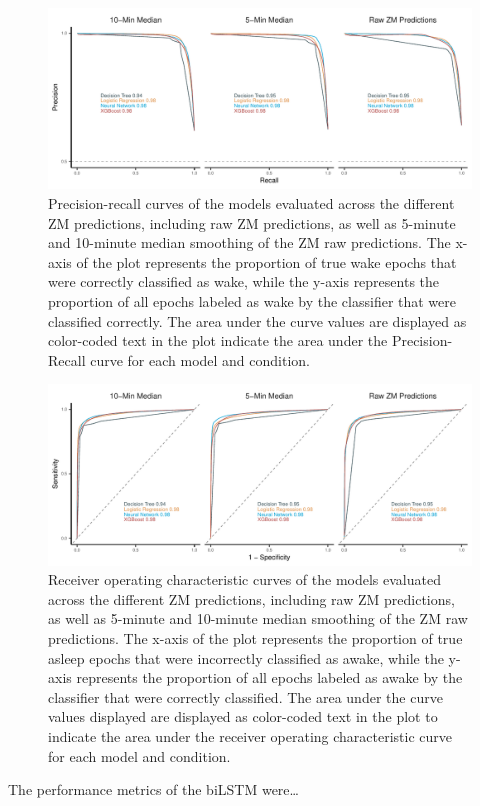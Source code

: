 \documentclass[
  super,
  preprint,
  3p]{elsarticle}
\begin{document}
\begin{figure}[b]

{\centering \includegraphics{visuals/plot_sleep_pr.pdf}

}

\caption{\label{fig-pr_curves}Precision-recall curves of the models
evaluated across the different ZM predictions, including raw ZM
predictions, as well as 5-minute and 10-minute median smoothing of the
ZM raw predictions. The x-axis of the plot represents the proportion of
true wake epochs that were correctly classified as wake, while the
y-axis represents the proportion of all epochs labeled as wake by the
classifier that were classified correctly. The area under the curve
values are displayed as color-coded text in the plot indicate the area
under the Precision-Recall curve for each model and condition.}

\end{figure}

\begin{figure}[b]

{\centering \includegraphics{visuals/plot_sleep_roc.pdf}

}

\caption{\label{fig-roc_curves}Receiver operating characteristic curves
of the models evaluated across the different ZM predictions, including
raw ZM predictions, as well as 5-minute and 10-minute median smoothing
of the ZM raw predictions. The x-axis of the plot represents the
proportion of true asleep epochs that were incorrectly classified as
awake, while the y-axis represents the proportion of all epochs labeled
as awake by the classifier that were correctly classified. The area
under the curve values displayed are displayed as color-coded text in
the plot to indicate the area under the receiver operating
characteristic curve for each model and condition.}

\end{figure}

The performance metrics of the biLSTM were\ldots{}

\newpage


\renewcommand\refname{References}
  
\end{document}
